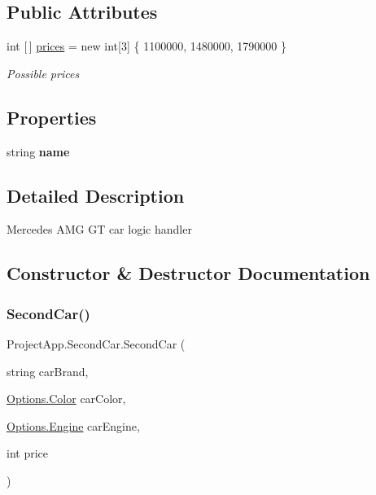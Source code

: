 \subsection*{Public Attributes}
\begin{DoxyCompactItemize}
\item 
int \mbox{[}$\,$\mbox{]} \mbox{\hyperlink{class_project_app_1_1_second_car_abc3f9ef0f6b46c69397f59934166eab7}{prices}} = new int\mbox{[}3\mbox{]} \{ 1100000, 1480000, 1790000 \}
\begin{DoxyCompactList}\small\item\em Possible prices \end{DoxyCompactList}\end{DoxyCompactItemize}
\subsection*{Properties}
\begin{DoxyCompactItemize}
\item 
\mbox{\label{class_project_app_1_1_second_car_a05f7978dba1848ebff25f1b0707e3bf3}} 
string {\bfseries name}
\end{DoxyCompactItemize}


\subsection{Detailed Description}
Mercedes A\+MG GT car logic handler 



\subsection{Constructor \& Destructor Documentation}
\mbox{\label{class_project_app_1_1_second_car_aa2e0c69381061f3528bd36ccda363309}} 
\subsubsection{\texorpdfstring{Second\+Car()}{SecondCar()}\hspace{0.1cm}{\footnotesize\ttfamily [1/2]}}
{\footnotesize\ttfamily Project\+App.\+Second\+Car.\+Second\+Car (\begin{DoxyParamCaption}\item[{string}]{car\+Brand,  }\item[{\mbox{\hyperlink{class_project_app_1_1_options_aaa68b08af20deeebf73e6bc6de725c44}{Options.\+Color}}}]{car\+Color,  }\item[{\mbox{\hyperlink{class_project_app_1_1_options_a95e313182e8122da719f7c8caefcc88d}{Options.\+Engine}}}]{car\+Engine,  }\item[{int}]{price }\end{DoxyParamCaption})}



